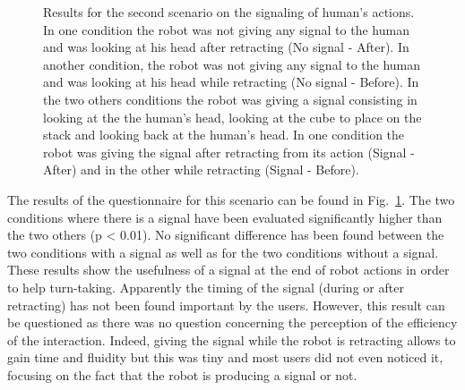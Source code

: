 \documentclass[english,a4paper,11pt,twoside]{StyleThese}
\begin{document}
\begin{figure}[!h]
\centering
	\hfill
    \caption{Results for the second scenario on the signaling of human's actions. In one condition the robot was not giving any signal to the human and was looking at his head after retracting (No signal - After). In another condition, the robot was not giving any signal to the human and was looking at his head while retracting (No signal - Before). In the two others conditions the robot was giving a signal consisting in looking at the the human's head, looking at the cube to place on the stack and looking back at the human's head. In one condition the robot was giving the signal after retracting from its action (Signal - After) and in the other while retracting (Signal - Before).}
    \label{fig:resSce5}
\end{figure}

The results of the questionnaire for this scenario can be found in Fig.~\ref{fig:resSce5}. The two conditions where there is a signal have been evaluated significantly higher than the two others (p < 0.01). No significant difference has been found between the two conditions with a signal as well as for the two conditions without a signal. These results show the usefulness of a signal at the end of robot actions in order to help turn-taking. Apparently the timing of the signal (during or after retracting) has not been found important by the users. However, this result can be questioned as there was no question concerning the perception of the efficiency of the interaction. Indeed, giving the signal while the robot is retracting allows to gain time and fluidity but this was tiny and most users did not even noticed it, focusing on the fact that the robot is producing a signal or not.
\end{document}
